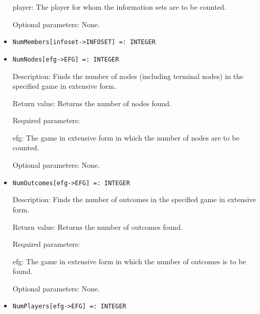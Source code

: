 \begin{itemize}
\bd
\item
[player:] The player for whom the information sets are to be counted.
\item
 [Optional parameters:] None.
\ed
\ed

\item
\protect \large \begin{verbatim}
NumMembers[infoset->INFOSET] =: INTEGER
\end{verbatim}\normalsize

\item
\protect \large \begin{verbatim}
NumNodes[efg->EFG] =: INTEGER
\end{verbatim}\normalsize

\bd
\item
[Description:] Finds the number of nodes (including terminal nodes) in
the specified game in extensive form.
\item
[Return value:] Returns the number of nodes found.
\item
[Required parameters:]\hfil\null

\bd
\item
[efg:] The game in extensive form in which the number of nodes are to
be counted.
\ed

\item
[Optional parameters:] None.
\ed

\item
\protect \large \begin{verbatim}
NumOutcomes[efg->EFG] =: INTEGER
\end{verbatim} \normalsize

\bd
\item
[Description:] Finds the number of outcomes in the specified game
in extensive form.
\item
[Return value:] Returns the number of outcomes found.
\item
[Required parameters:] \hfil\null

\bd
\item
[efg:] The game in extensive form in which the number of outcomes is
to be found.
\ed

\item
[Optional parameters:] None.
\ed

\item
\protect \large \begin{verbatim}
NumPlayers[efg->EFG] =: INTEGER
\end{verbatim} \normalsize


\end{itemize}
